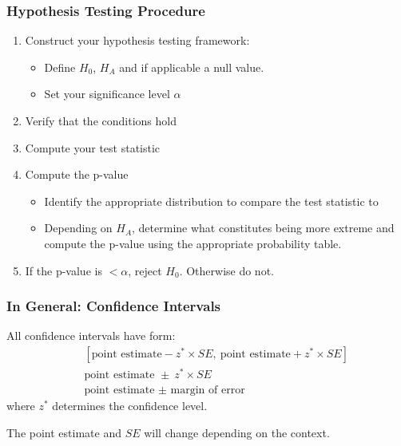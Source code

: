 \documentclass[handout]{beamer}
\newcommand{\blue}[1]{\textcolor{blue2}{#1}}
\begin{document}
\begin{frame}
\frametitle{Hypothesis Testing Procedure}\label{ht}
\begin{enumerate}
\item Construct your hypothesis testing framework:
\begin{itemize}
\item Define $H_0$, $H_A$ and if applicable a null value.
\item Set your significance level $\alpha$
\end{itemize}
\item Verify that the conditions hold
\item Compute your \blue{test statistic}
\item Compute the p-value
\begin{itemize}
\item Identify the appropriate distribution to compare the test statistic to
\item Depending on $H_A$, determine what constitutes being \blue{more extreme} and compute the p-value using the appropriate probability table.
\end{itemize}
\item If the p-value is $< \alpha$, reject $H_0$.  Otherwise do not.
\end{enumerate}

\end{frame}




\begin{frame}[fragile]
\frametitle{In General:  Confidence Intervals}

All confidence intervals have form:
\begin{eqnarray*}
&& \left[\mbox{point estimate} - z^* \times SE, \ \mbox{point estimate} + z^* \times SE\right]\\
&& \mbox{point estimate } \pm \ z^* \times SE\\
&& \mbox{point estimate } \pm \mbox{ margin of error}
\end{eqnarray*}
where $z^*$ determines the confidence level.

\pause\vspace{0.25cm}

The point estimate and $SE$ will change depending on the context.  

\end{frame}
\end{document}
